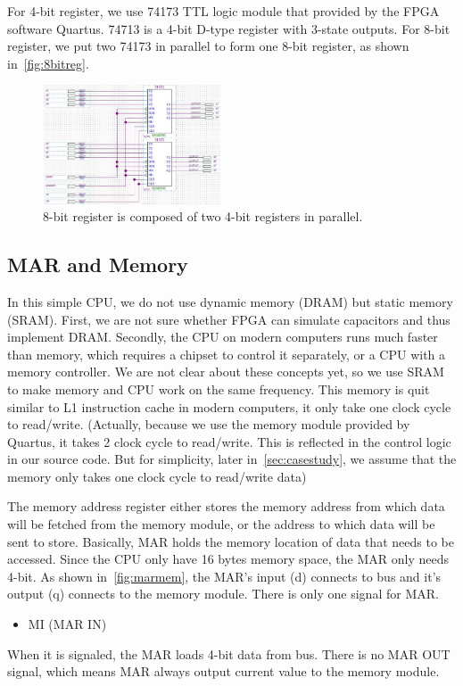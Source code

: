 For 4-bit register, we use 74173 TTL logic module that provided by the FPGA software Quartus. 74713 is a 4-bit D-type register with 3-state outputs. For 8-bit register, we put two 74173 in parallel to form one 8-bit register, as shown in~\autoref{fig:8bitreg}.

\begin{figure}[th]
	\includegraphics[width=0.47\textwidth]{figures/8bitreg}
	\centering
	\caption{8-bit register is composed of two 4-bit registers in parallel.}
	\label{fig:8bitreg}
\end{figure}


\subsection{MAR and Memory}

In this simple CPU, we do not use dynamic memory (DRAM) but static memory (SRAM). First, we are not sure whether FPGA can simulate capacitors and thus implement DRAM. Secondly, the CPU on modern computers runs much faster than memory, which requires a chipset to control it separately, or a CPU with a memory controller. We are not clear about these concepts yet, so we use SRAM to make memory and CPU work on the same frequency. This memory is quit similar to L1 instruction cache in modern computers, it only take one clock cycle to read/write. (Actually, because we use the memory module provided by Quartus, it takes 2 clock cycle to read/write. This is reflected in the control logic in our source code. But for simplicity, later in~\autoref{sec:casestudy}, we assume that the memory only takes one clock cycle to read/write data)


The memory address register either stores the memory address from which data will be fetched from the memory module, or the address to which data will be sent to store. Basically, MAR holds the memory location of data that needs to be accessed. Since the CPU only have 16 bytes memory space, the MAR only needs 4-bit. As shown in~\autoref{fig:marmem}, the MAR's input (d) connects to bus and it's output (q) connects to the memory module. There is only one signal for MAR. 
\begin{itemize}
	\item MI (MAR IN)
\end{itemize}
When it is signaled, the MAR loads 4-bit data from bus. There is no MAR OUT signal, which means MAR always output current value to the memory module.

